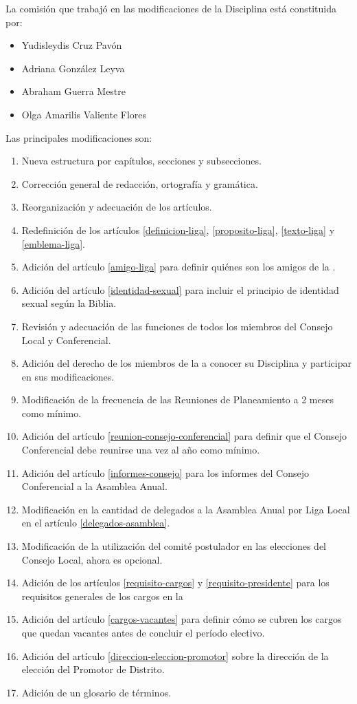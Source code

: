 
La comisión que trabajó en las modificaciones de la Disciplina está constituida por:
\begin{itemize}[noitemsep]
    \item Yudisleydis Cruz Pavón
    \item Adriana González Leyva
    \item Abraham Guerra Mestre
    \item Olga Amarilis Valiente Flores
\end{itemize}

Las principales modificaciones son:
\begin{enumerate}[noitemsep]
    \item Nueva estructura por capítulos, secciones y subsecciones.
    \item Corrección general de redacción, ortografía y gramática.
    \item Reorganización y adecuación de los artículos.
    \item Redefinición de los artículos \ref{definicion-liga}, \ref{proposito-liga}, \ref{texto-liga} y \ref{emblema-liga}.
    \item Adición del artículo \ref{amigo-liga} para definir quiénes son los amigos de la \LMJ{}.
    \item Adición del artículo \ref{identidad-sexual} para incluir el principio de identidad sexual según la Biblia.
    \item Revisión y adecuación de las funciones de todos los miembros del Consejo Local y Conferencial.
    \item Adición del derecho de los miembros de la \LMJ{} a conocer su Disciplina y participar en sus modificaciones.
    \item Modificación de la frecuencia de las Reuniones de Planeamiento a 2 meses como mínimo.
    \item Adición del artículo \ref{reunion-consejo-conferencial} para definir que el Consejo Conferencial debe reunirse una vez al año como mínimo.
    \item Adición del artículo \ref{informes-consejo} para los informes del Consejo Conferencial a la Asamblea Anual.
    \item Modificación en la cantidad de delegados a la Asamblea Anual por Liga Local en el artículo \ref{delegados-asamblea}.
    \item Modificación de la utilización del comité postulador en las elecciones del Consejo Local, ahora es opcional.
    \item Adición de los artículos \ref{requisito-cargos} y \ref{requisito-presidente} para los requisitos generales de los cargos en la \LMJ{}
    \item Adición del artículo \ref{cargos-vacantes} para definir cómo se cubren los cargos que quedan vacantes antes de concluir el período electivo.
    \item Adición del artículo \ref{direccion-eleccion-promotor} sobre la dirección de la elección del Promotor de Distrito.
    \item Adición de un glosario de términos.
\end{enumerate}

